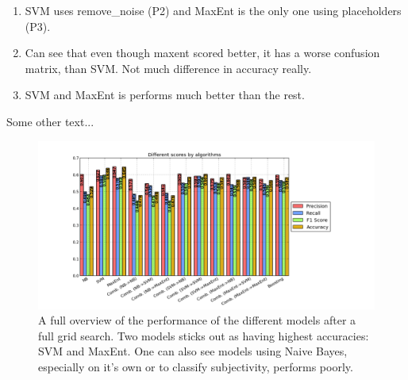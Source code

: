 \begin{enumerate}
\item SVM uses remove\_noise (P2) and MaxEnt is the only one using placeholders (P3). 
 
\item Can see that even though maxent scored better, it has a worse confusion matrix, than SVM. Not much difference in accuracy really. 

\item SVM and MaxEnt is performs much better than the rest. 
\end{enumerate}

Some other text... 

\begin{figure}
 \begin{center}
     \includegraphics[width=\linewidth]{../img/plots/grid/full.png}
 \end{center}
 \caption[Results overview across models]{A full overview of the performance of the different models after a full grid search. Two models sticks out as having highest accuracies: SVM and MaxEnt. One can also see models using Naive Bayes, especially on it's own or to classify subjectivity, performs poorly.}
 \label{fig:results_full}
\end{figure}



